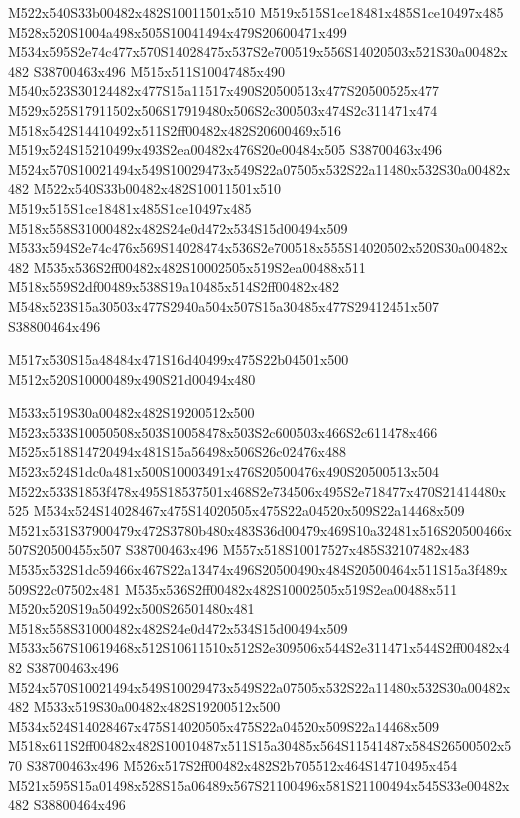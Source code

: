 \documentclass{article}
\begin{document}
\begin{multicols}{2}
M522x540S33b00482x482S10011501x510 M519x515S1ce18481x485S1ce10497x485 M528x520S1004a498x505S10041494x479S20600471x499 M534x595S2e74c477x570S14028475x537S2e700519x556S14020503x521S30a00482x482 S38700463x496 M515x511S10047485x490 M540x523S30124482x477S15a11517x490S20500513x477S20500525x477 M529x525S17911502x506S17919480x506S2c300503x474S2c311471x474 M518x542S14410492x511S2ff00482x482S20600469x516 M519x524S15210499x493S2ea00482x476S20e00484x505 S38700463x496 M524x570S10021494x549S10029473x549S22a07505x532S22a11480x532S30a00482x482 M522x540S33b00482x482S10011501x510 M519x515S1ce18481x485S1ce10497x485 M518x558S31000482x482S24e0d472x534S15d00494x509 M533x594S2e74c476x569S14028474x536S2e700518x555S14020502x520S30a00482x482 M535x536S2ff00482x482S10002505x519S2ea00488x511 M518x559S2df00489x538S19a10485x514S2ff00482x482 M548x523S15a30503x477S2940a504x507S15a30485x477S29412451x507 S38800464x496

\begin{center}
M517x530S15a48484x471S16d40499x475S22b04501x500 M512x520S10000489x490S21d00494x480 
\end{center}


M533x519S30a00482x482S19200512x500 M523x533S10050508x503S10058478x503S2c600503x466S2c611478x466 M525x518S14720494x481S15a56498x506S26c02476x488 M523x524S1dc0a481x500S10003491x476S20500476x490S20500513x504 M522x533S1853f478x495S18537501x468S2e734506x495S2e718477x470S21414480x525 M534x524S14028467x475S14020505x475S22a04520x509S22a14468x509 M521x531S37900479x472S3780b480x483S36d00479x469S10a32481x516S20500466x507S20500455x507 S38700463x496 M557x518S10017527x485S32107482x483 M535x532S1dc59466x467S22a13474x496S20500490x484S20500464x511S15a3f489x509S22c07502x481 M535x536S2ff00482x482S10002505x519S2ea00488x511 M520x520S19a50492x500S26501480x481 M518x558S31000482x482S24e0d472x534S15d00494x509 M533x567S10619468x512S10611510x512S2e309506x544S2e311471x544S2ff00482x482 S38700463x496 M524x570S10021494x549S10029473x549S22a07505x532S22a11480x532S30a00482x482 M533x519S30a00482x482S19200512x500 M534x524S14028467x475S14020505x475S22a04520x509S22a14468x509 M518x611S2ff00482x482S10010487x511S15a30485x564S11541487x584S26500502x570 S38700463x496 M526x517S2ff00482x482S2b705512x464S14710495x454 M521x595S15a01498x528S15a06489x567S21100496x581S21100494x545S33e00482x482 S38800464x496


\end{multicols}
\end{document}
